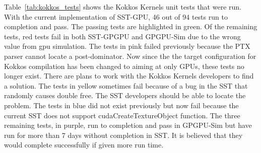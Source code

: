 Table~\ref{tab:kokkos_tests} shows the Kokkos Kernels unit tests that were run.
With the current implementation of SST-GPU, 46 out of 94 tests run to completion
and pass. The passing tests are highlighted in green. Of the remaining tests,
red tests fail in both SST-GPGPU and GPGPU-Sim due to the wrong value from gpu simulation. The tests in pink
failed previously because the PTX parser cannot locate a post-dominator. Now since
the the target configuration for Kokkos compilation has been changed 
to aiming at only GPUs, these tests no longer exist. There
are plans to work with the Kokkos Kernels developers to find a solution. The
tests in yellow sometimes fail because of a bug in the SST that randomly causes double free. 
The SST developers should be able to locate the problem. The tests in blue did not exist previously but now fail 
because the current SST does not support cudaCreateTextureObject function. 
The three remaining tests, in purple, run to completion
and pass in GPGPU-Sim but have run for more than 7 days without completion in SST. It is believed that they would complete successfully if given more run time.

